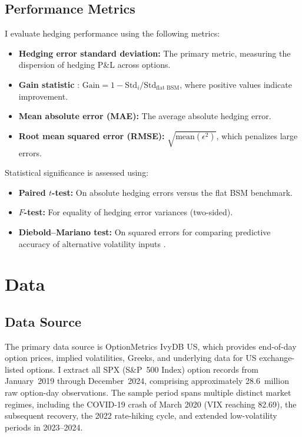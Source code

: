 \documentclass[12pt, letterpaper]{article}
\begin{document}
\subsection{Performance Metrics}
\label{sec:metrics}

I evaluate hedging performance using the following metrics:

\begin{itemize}
    \item \textbf{Hedging error standard deviation:} The primary metric, measuring the dispersion of hedging P\&L across options.
    \item \textbf{Gain statistic} \citep{Hull2017}: $\text{Gain} = 1 - \text{Std}_i / \text{Std}_{\text{flat BSM}}$, where positive values indicate improvement.
    \item \textbf{Mean absolute error (MAE):} The average absolute hedging error.
    \item \textbf{Root mean squared error (RMSE):} $\sqrt{\text{mean}(\epsilon^2)}$, which penalizes large errors.
\end{itemize}

Statistical significance is assessed using:
\begin{itemize}
    \item \textbf{Paired $t$-test:} On absolute hedging errors versus the flat BSM benchmark.
    \item \textbf{$F$-test:} For equality of hedging error variances (two-sided).
    \item \textbf{Diebold--Mariano test:} On squared errors for comparing predictive accuracy of alternative volatility inputs \citep{DieboldMariano1995}.
\end{itemize}


\section{Data}
\label{sec:data}

\subsection{Data Source}

The primary data source is OptionMetrics IvyDB US, which provides end-of-day option prices, implied volatilities, Greeks, and underlying data for US exchange-listed options. I extract all SPX (S\&P~500 Index) option records from January~2019 through December~2024, comprising approximately 28.6~million raw option-day observations. The sample period spans multiple distinct market regimes, including the COVID-19 crash of March 2020 (VIX reaching 82.69), the subsequent recovery, the 2022 rate-hiking cycle, and extended low-volatility periods in 2023--2024.
\end{document}
